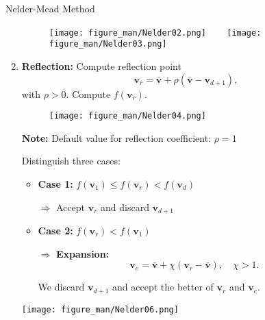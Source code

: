 \documentclass[11pt,compress,t,notes=noshow, xcolor=table]{beamer}
\begin{document}
\begin{vbframe}{Nelder-Mead Method}
\begin{enumerate}
\begin{figure}
\texttt{[image: figure\_man/Nelder02.png]} ~~~ \texttt{[image: figure\_man/Nelder03.png]}
\end{figure}

\framebreak

\item \textbf{Reflection:} Compute reflection point
$$
\mathbf{v}_r = \bar{\mathbf{v}} + \rho (\bar{\mathbf{v}} - \mathbf{v}_{d + 1}),
$$
with $\rho > 0$.
Compute $f(\mathbf{v}_r)$.

\vspace{\baselineskip}

\begin{figure}
\texttt{[image: figure\_man/Nelder04.png]} 
\end{figure}

\vspace{\baselineskip}

\textbf{Note:} Default value for reflection coefficient: $\rho = 1$

\framebreak

\small
Distinguish three cases:

\begin{itemize}
\small
\item \textbf{Case 1:} $f(\mathbf{v}_1) \leq f(\mathbf{v}_r) < f(\mathbf{v}_d)$

\medskip

$\Rightarrow$ Accept $\mathbf{v}_r$ and discard $\mathbf{v}_{d + 1}$
\end{itemize}


\medskip

\begin{minipage}{0.57\textwidth}
\begin{itemize}
\small
\item \textbf{Case 2:} $f(\mathbf{v}_r) < f(\mathbf{v}_1)$

\medskip

$\Rightarrow$ \textbf{Expansion:} 
\begin{equation*}
\mathbf{v}_e = \bar{\mathbf{v}} + \chi (\mathbf{v}_{r} - \bar{\mathbf{v}}), \quad \chi > 1.
\end{equation*}

We discard $\mathbf{v}_{d + 1}$ and accept the better of $\mathbf{v}_r$ and $\mathbf{v}_e$.
\end{itemize}
\end{minipage}
\begin{minipage}{0.35\textwidth}
\begin{center}
\texttt{[image: figure\_man/Nelder06.png]}
\end{center}
\end{minipage}


\end{enumerate}
\end{vbframe}
\end{document}
